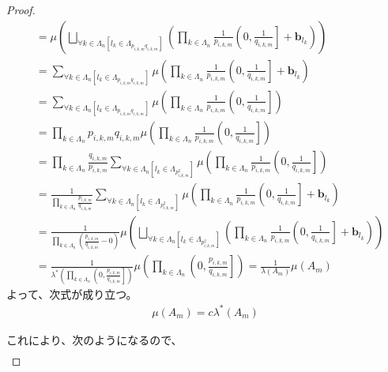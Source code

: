 \documentclass[dvipdfmx]{jsarticle}
\begin{document}
\begin{proof}
\begin{align*}
&= \mu\left( \bigsqcup_{\forall k \in \varLambda_{n}\left[ l_{k} \in \varLambda_{p_{i,k,m}q_{i,k,m}} \right]} \left( \prod_{k \in \varLambda_{n}} {\frac{1}{p_{i,k,m}}\left( 0,\frac{1}{q_{i,k,m}} \right]} + \mathbf{b}_{l_{k}} \right) \right)\\
&= \sum_{\forall k \in \varLambda_{n}\left[ l_{k} \in \varLambda_{p_{i,k,m}q_{i,k,m}} \right]} {\mu\left( \prod_{k \in \varLambda_{n}} {\frac{1}{p_{i,k,m}}\left( 0,\frac{1}{q_{i,k,m}} \right]} + \mathbf{b}_{l_{k}} \right)}\\
&= \sum_{\forall k \in \varLambda_{n}\left[ l_{k} \in \varLambda_{p_{i,k,m}q_{i,k,m}} \right]} {\mu\left( \prod_{k \in \varLambda_{n}} {\frac{1}{p_{i,k,m}}\left( 0,\frac{1}{q_{i,k,m}} \right]} \right)}\\
&= \prod_{k \in \varLambda_{n}} {p_{i,k,m}q_{i,k,m}}\mu\left( \prod_{k \in \varLambda_{n}} {\frac{1}{p_{i,k,m}}\left( 0,\frac{1}{q_{i,k,m}} \right]} \right)\\
&= \prod_{k \in \varLambda_{n}} \frac{q_{i,k,m}}{p_{i,k,m}}\sum_{\forall k \in \varLambda_{n}\left[ l_{k} \in \varLambda_{p_{i,k,m}^{2}} \right]} {\mu\left( \prod_{k \in \varLambda_{n}} {\frac{1}{p_{i,k,m}}\left( 0,\frac{1}{q_{i,k,m}} \right]} \right)}\\
&= \frac{1}{\prod_{k \in \varLambda_{n}} \frac{p_{i,k,m}}{q_{i,k,m}}}\sum_{\forall k \in \varLambda_{n}\left[ l_{k} \in \varLambda_{p_{i,k,m}^{2}} \right]} {\mu\left( \prod_{k \in \varLambda_{n}} {\frac{1}{p_{i,k,m}}\left( 0,\frac{1}{q_{i,k,m}} \right]} + \mathbf{b}_{l_{k}} \right)}\\
&= \frac{1}{\prod_{k \in \varLambda_{n}} \left( \frac{p_{i,k,m}}{q_{i,k,m}} - 0 \right)}\mu\left( \bigsqcup_{\forall k \in \varLambda_{n}\left[ l_{k} \in \varLambda_{p_{i,k,m}^{2}} \right]} \left( \prod_{k \in \varLambda_{n}} {\frac{1}{p_{i,k,m}}\left( 0,\frac{1}{q_{i,k,m}} \right]} + \mathbf{b}_{l_{k}} \right) \right)\\
&= \frac{1}{\lambda^{*}\left( \prod_{k \in \varLambda_{n}} \left( 0,\frac{p_{i,k,m}}{q_{i,k,m}} \right] \right)}\mu\left( \prod_{k \in \varLambda_{n}} \left( 0,\frac{p_{i,k,m}}{q_{i,k,m}} \right] \right) = \frac{1}{\lambda\left( A_{m} \right)}\mu\left( A_{m} \right)
\end{align*}
よって、次式が成り立つ。
\begin{align*}
\mu\left( A_{m} \right) = c\lambda^{*}\left( A_{m} \right)
\end{align*}\par
これにより、次のようになるので、
\begin{align*}

\end{align*}
\end{proof}
\end{document}
